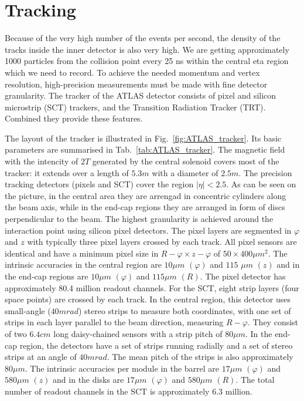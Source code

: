 \section{Tracking}
\label{sec:ATLAS_tracker}

Because of the very high number of the events per second, the density of the tracks inside the inner detector is also very high. We are getting approximately 1000 particles
from the collision point every 25 ns within the central eta region which we need to record. To achieve the needed momentum and vertex resolution, high-precision measurements must be made with fine detector granularity. The tracker of the ATLAS detector consists of pixel and silicon microstrip (SCT) trackers, and the Transition Radiation Tracker (TRT). Combined they provide these features.

\begin{figure}
\end{figure}

The layout of the tracker is illustrated in Fig.~\ref{fig:ATLAS_tracker}. Its
basic parameters are summarised in Tab.~\ref{tab:ATLAS_tracker}. The magnetic field with the intencity of $2T$ generated by the central solenoid covers most of the tracker: it extends over a length of $5.3 m$ with a diameter of $2.5 m$. The precision tracking detectors (pixels and SCT) cover the region
$|\eta|<2.5$. As can be seen on the picture, in the central area they are arrengad in concentric cylinders along the beam axis, while in the end-cap regions they are arranged in form of discs perpendicular to the beam. The highest granularity is achieved around the interaction point using silicon pixel detectors. The pixel layers are
segmented in $\varphi$ and $z$ with typically three pixel layers crossed by each track. All pixel sensors
are identical and have a minimum pixel size in $R-\varphi \times z-\varphi$ of $50 \times 400 \mu m^2$. The intrinsic accuracies
in the central region are $10 \mu m$ $(\varphi)$ and $115$ $\mu m$ $(z)$ and in the end-cap regions are $10 \mu m$ $(\varphi)$ and $115 \mu m$ $(R)$.
The pixel detector has approximately 80.4 million readout channels. For the SCT, eight strip layers
(four space points) are crossed by each track. In the central region, this detector uses small-angle
($40 mrad$) stereo strips to measure both coordinates, with one set of strips in each layer parallel to
the beam direction, measuring $R-\varphi$. They consist of two $6.4 cm$ long daisy-chained sensors with
a strip pitch of $80 \mu m$. In the end-cap region, the detectors have a set of strips running radially and
a set of stereo strips at an angle of $40 mrad$. The mean pitch of the strips is also approximately
$80 \mu m$. The intrinsic accuracies per module in the barrel are $17 \mu m$ $(\varphi)$ and $580 \mu m$ $(z)$ and in
the disks are $17 \mu m$ $(\varphi)$ and $580 \mu m$ $(R)$. The total number of readout channels in the SCT is
approximately 6.3 million.

